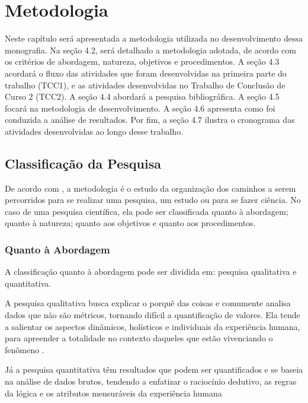 \chapter[Metodologia]{Metodologia}
\label{ch:metodologia}

Neste capítulo será apresentada a metodologia utilizada no desenvolvimento dessa 
monografia. Na seção 4.2, será detalhado a metodologia adotada, de acordo com os 
critérios de abordagem, natureza, objetivos e procedimentos. A seção 4.3 acordará o fluxo 
das atividades que foram desenvolvidas na primeira parte do trabalho (TCC1), e as atividades
 desenvolvidas no Trabalho de Conclusão de Curso 2 (TCC2). A seção 4.4 abordará a pesquisa 
 bibliográfica.
A seção 4.5 focará na metodologia de desenvolvimento. A seção 4.6 apresenta como foi conduzida 
a análise de resultados. 
Por fim, a seção 4.7 ilustra 
o cronograma das atividades desenvolvidas ao longo desse trabalho.


\section{Classificação da Pesquisa}

De acordo com , a metodologia é o estudo da organização dos 
caminhos a serem percorridos para se realizar uma pesquisa, um estudo ou para se 
fazer ciência. No caso de uma pesquisa científica, ela pode ser classificada quanto à 
abordagem; quanto à natureza; quanto aos objetivos e quanto aos procedimentos.

\subsection{Quanto à Abordagem}

A classificação quanto à abordagem pode ser dividida em: pesquisa qualitativa e quantitativa. 

A pesquisa qualitativa busca explicar o porquê das coisas e 
comumente analisa dados que não são métricos, tornando difícil 
a quantificação de valores. Ela tende a salientar os
aspectos dinâmicos, holísticos e individuais da experiência humana, para apreender
a totalidade no contexto daqueles que estão vivenciando o fenômeno \cite{gerhardt2009}.

Já a pesquisa quantitativa têm resultados que podem ser quantificados e se baseia na 
análise de dados brutos, tendendo a enfatizar o raciocínio dedutivo, as regras da lógica 
e os atributos mensuráveis da experiência humana


